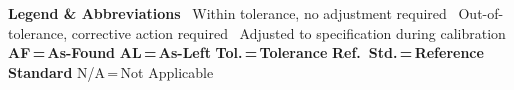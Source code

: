 \vspace{6pt}

\noindent
\begin{tcolorbox}[
  enhanced,
  colback=LightGray,
  colframe=NexaSilver,
  arc=3pt,
  boxrule=0.5pt,
  left=8pt, right=8pt, top=4pt, bottom=4pt
]
\noindent\textcolor{NexaBlue}{\small\bfseries\faInfoCircle\; Legend \& Abbreviations}\quad
{\small
\passbadge\ Within tolerance, no adjustment required \quad
\failbadge\ Out-of-tolerance, corrective action required \quad
\adjbadge\ Adjusted to specification during calibration \quad
\textbf{AF\,=\,As-Found}\quad
\textbf{AL\,=\,As-Left}\quad
\textbf{Tol.\,=\,Tolerance}\quad
\textbf{Ref.\ Std.\,=\,Reference Standard}\quad
N/A\,=\,Not Applicable
}
\end{tcolorbox}

\vspace{4pt}
